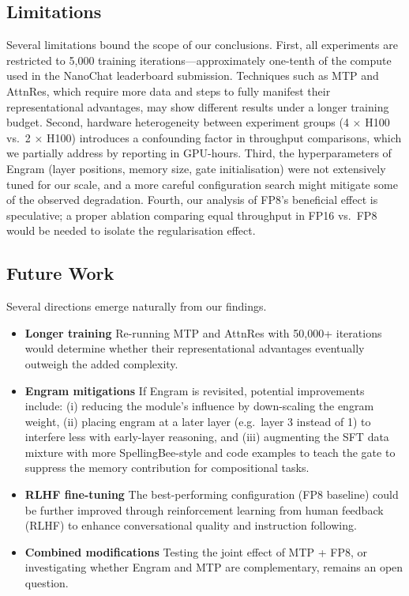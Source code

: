 \subsection{Limitations}

Several limitations bound the scope of our conclusions.
First, all experiments are restricted to 5{,}000 training iterations---approximately one-tenth of
the compute used in the NanoChat leaderboard submission.
Techniques such as MTP and AttnRes, which require more data and steps to fully manifest their
representational advantages, may show different results under a longer training budget.
Second, hardware heterogeneity between experiment groups (4 $\times$ H100 vs.\
2 $\times$ H100) introduces a confounding factor in throughput comparisons, which we partially
address by reporting in GPU-hours.
Third, the hyperparameters of Engram (layer positions, memory size, gate initialisation) were not
extensively tuned for our scale, and a more careful configuration search might mitigate some of
the observed degradation.
Fourth, our analysis of FP8's beneficial effect is speculative; a proper ablation comparing equal
throughput in FP16 vs.\ FP8 would be needed to isolate the regularisation effect.

\subsection{Future Work}

Several directions emerge naturally from our findings.
\begin{itemize}
  \item \textbf{Longer training}
  Re-running MTP and AttnRes with 50{,}000+ iterations would determine whether their
  representational advantages eventually outweigh the added complexity.
  \item \textbf{Engram mitigations}
  If Engram is revisited, potential improvements include: (i) reducing the module's influence by
  down-scaling the engram weight, (ii) placing engram at a later layer (e.g.\ layer 3 instead of
  1) to interfere less with early-layer reasoning, and (iii) augmenting the SFT data mixture with
  more SpellingBee-style and code examples to teach the gate to suppress the memory contribution
  for compositional tasks.
  \item \textbf{RLHF fine-tuning}
  The best-performing configuration (FP8 baseline) could be further improved through
  reinforcement learning from human feedback (RLHF) to enhance conversational quality and
  instruction following.
  \item \textbf{Combined modifications}
  Testing the joint effect of MTP + FP8, or investigating whether Engram and MTP are
  complementary, remains an open question.
\end{itemize}


